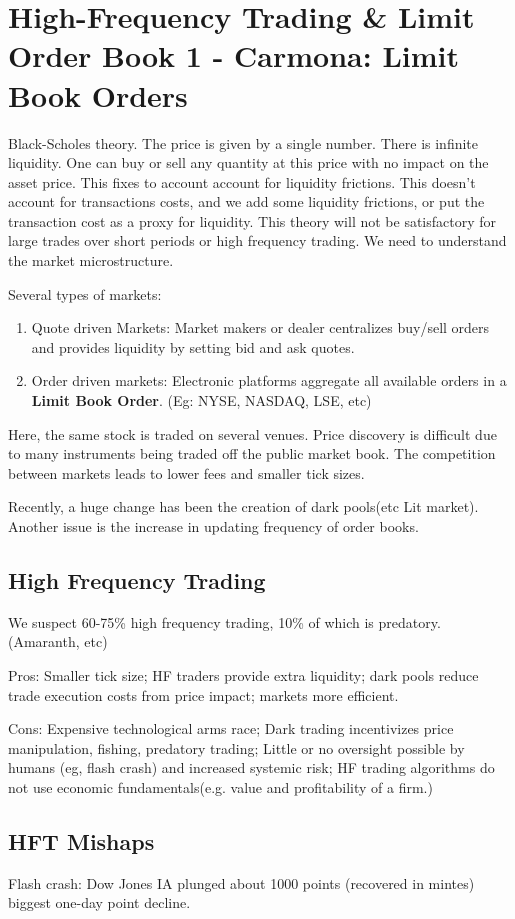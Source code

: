 \chapter{High-Frequency Trading \& Limit Order Book 1 - Carmona: Limit Book Orders}
Black-Scholes theory. The price is given by a single number. There is infinite liquidity. One can buy or sell any quantity at this price with no impact on the asset price. This fixes to account account for liquidity frictions. This doesn't account for transactions costs, and we add some liquidity frictions, or put the transaction cost as a proxy for liquidity. This theory will not be satisfactory for large trades over short periods or high frequency trading. We need to understand the market microstructure.

Several types of markets:
\begin{enumerate}
	\item Quote driven Markets: Market makers or dealer centralizes buy/sell orders and provides liquidity by setting bid and ask quotes.
	\item Order driven markets: Electronic platforms aggregate all available orders in a {\bf Limit Book Order}. (Eg: NYSE, NASDAQ, LSE, etc)
\end{enumerate}
Here, the same stock is traded on several venues. Price discovery is difficult due to many instruments being traded off the public market book. The competition between markets leads to lower fees and smaller tick sizes.

Recently, a huge change has been the creation of dark pools(etc Lit market). Another issue is the increase in updating frequency of order books.

\section{High Frequency Trading}
We suspect 60-75\% high frequency trading, 10\% of which is predatory. (Amaranth, etc)

Pros: Smaller tick size; HF traders provide extra liquidity; dark pools reduce trade execution costs from price impact; markets more efficient.

Cons: Expensive technological arms race; Dark trading incentivizes price manipulation, fishing, predatory trading; Little or no oversight possible by humans (eg, flash crash) and increased systemic risk; HF trading algorithms do not use economic fundamentals(e.g. value and profitability of a firm.)

\section{HFT Mishaps}
Flash crash: Dow Jones IA plunged about 1000 points (recovered in mintes) biggest one-day point decline.


